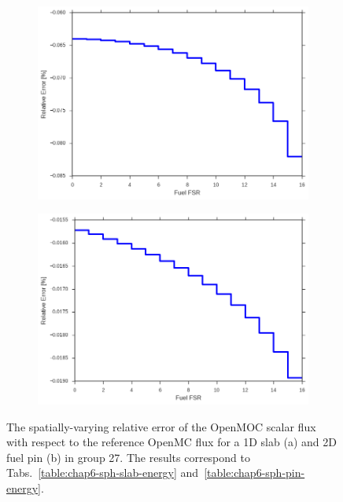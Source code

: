 \begin{figure}[h!]
\begin{subfigure}{.9\textwidth}
  \centering
  \includegraphics[width=0.9\linewidth]{figures/sph/slab/rel-err-fuel-fsrs}
  \caption{}
\end{subfigure}
\begin{subfigure}{.9\textwidth}
  \centering
  \includegraphics[width=0.9\linewidth]{figures/sph/pin-cell/rel-err-fuel-fsrs}
  \caption{}
\end{subfigure}
\caption[Flux relative error by FSR with SPH]{The spatially-varying relative error of the OpenMOC scalar flux with respect to the reference OpenMC flux for a 1D slab (a) and 2D fuel pin (b) in group 27. The results correspond to Tabs.~\ref{table:chap6-sph-slab-energy} and~\ref{table:chap6-sph-pin-energy}.}
\label{fig:chap6-rel-err-space}
\end{figure}


